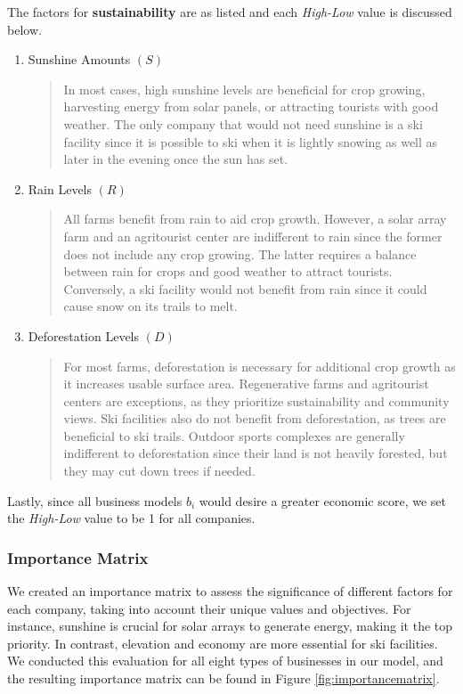 \documentclass{mcmthesis}
\begin{document}
The factors for \textbf{sustainability} are as listed and each \textit{High-Low} value is discussed below.
\begin{enumerate}
    \item Sunshine Amounts $(S)$
        \begin{quote}
            In most cases, high sunshine levels are beneficial for crop growing, harvesting energy from solar panels, or attracting tourists with good weather. The only company that would not need sunshine is a ski facility since it is possible to ski when it is lightly snowing as well as later in the evening once the sun has set.
        \end{quote}
    \item Rain Levels $(R)$
        \begin{quote}
            All farms benefit from rain to aid crop growth. However, a solar array farm and an agritourist center are indifferent to rain since the former does not include any crop growing. The latter requires a balance between rain for crops and good weather to attract tourists. Conversely, a ski facility would not benefit from rain since it could cause snow on its trails to melt. 
        \end{quote}
    \item Deforestation Levels $(D)$
        \begin{quote}
             For most farms, deforestation is necessary for additional crop growth as it increases usable surface area. Regenerative farms and agritourist centers are exceptions, as they prioritize sustainability and community views. Ski facilities also do not benefit from deforestation, as trees are beneficial to ski trails. Outdoor sports complexes are generally indifferent to deforestation since their land is not heavily forested, but they may cut down trees if needed.
        \end{quote}
\end{enumerate}

Lastly, since all business models $b_i$ would desire a greater economic score, we set the \textit{High-Low} value to be 1 for all companies. 

\subsubsection{Importance Matrix}

We created an importance matrix to assess the significance of different factors for each company, taking into account their unique values and objectives. For instance, sunshine is crucial for solar arrays to generate energy, making it the top priority. In contrast, elevation and economy are more essential for ski facilities. We conducted this evaluation for all eight types of businesses in our model, and the resulting importance matrix can be found in Figure \ref{fig:importancematrix}.
\end{document}
